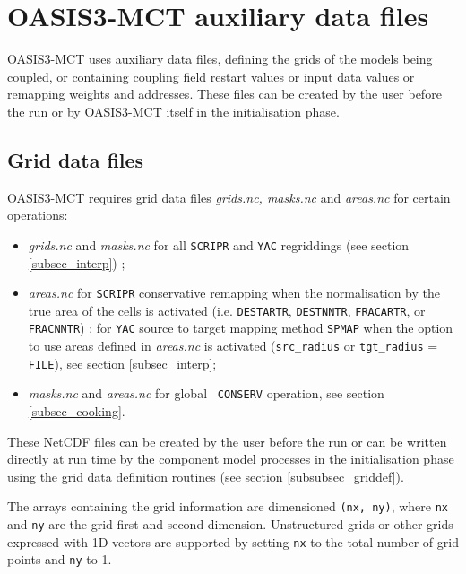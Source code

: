 \newpage
\chapter{OASIS3-MCT auxiliary data files}
\label{sec_auxiliary}

OASIS3-MCT uses auxiliary data files, defining the
grids of the models being coupled, or containing coupling field 
restart values or input data values or remapping weights and
addresses. These files can be created by the user before the run or by OASIS3-MCT itself in the initialisation phase.

\section{Grid data files}
\label{subsec_griddata}

OASIS3-MCT requires grid data files {\em grids.nc, masks.nc} and {\em
  areas.nc} for certain operations:
\begin{itemize}
  \item{\em grids.nc} and {\em masks.nc} for all {\tt SCRIPR} and {\tt YAC} regriddings (see
    section \ref{subsec_interp}) ;
  \item {\em areas.nc} for {\tt SCRIPR} conservative remapping
when the normalisation by the true area of the cells is 
activated (i.e. {\tt DESTARTR}, {\tt DESTNNTR}, {\tt FRACARTR}, or
{\tt FRACNNTR}) ; for {\tt YAC} source to target mapping method {\tt SPMAP} when the option to use areas defined in {\em areas.nc} is activated ({\tt src\_radius} or {\tt tgt\_radius} = {\tt FILE}), see section \ref{subsec_interp};
\item {\em masks.nc} and {\em areas.nc} for global {\tt
    CONSERV} operation, see section \ref{subsec_cooking}.
\end{itemize}

These NetCDF files can
be created by the user before the run or can be written directly at
run time by the component model processes in the initialisation phase
using the grid
data definition routines (see section \ref{subsubsec_griddef}).

The arrays containing the grid information are dimensioned {\tt (nx,
  ny)}, where {\tt nx} and {\tt ny} are the grid first and second
dimension.  Unstructured grids or other grids expressed with 1D
vectors are supported by setting {\tt nx} to the total number of grid
points and {\tt ny} to 1.

